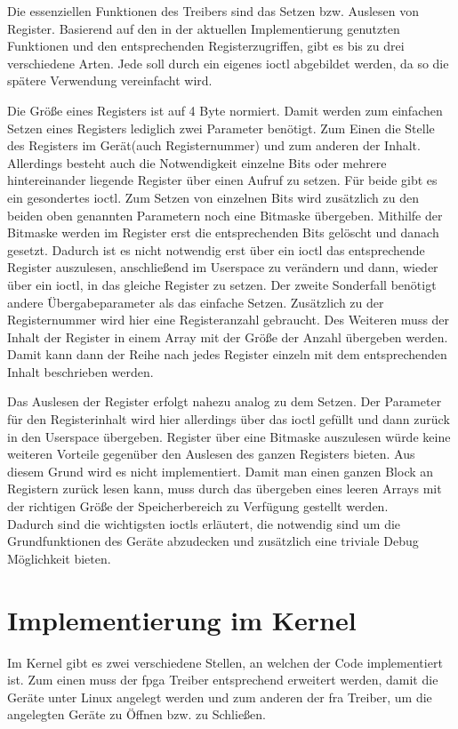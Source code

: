 Die essenziellen Funktionen des Treibers sind das Setzen bzw. Auslesen von Register. Basierend auf den in der aktuellen Implementierung genutzten Funktionen und den entsprechenden Registerzugriffen, gibt es bis zu drei verschiedene Arten. Jede soll durch ein eigenes \ac{ioctl} abgebildet werden, da so die spätere Verwendung vereinfacht wird.  


Die Größe eines Registers ist auf 4 Byte normiert. Damit werden zum einfachen Setzen eines Registers lediglich zwei Parameter benötigt. Zum Einen die Stelle des Registers im Gerät(auch Registernummer) und zum anderen der Inhalt. 
Allerdings besteht auch die Notwendigkeit einzelne Bits oder mehrere hintereinander liegende Register über einen Aufruf zu setzen. Für beide gibt es ein gesondertes \ac{ioctl}. Zum Setzen von einzelnen Bits wird zusätzlich zu den beiden oben genannten Parametern noch eine Bitmaske übergeben. Mithilfe der Bitmaske werden im Register erst die entsprechenden Bits gelöscht und danach gesetzt. Dadurch ist es nicht notwendig erst über ein \ac{ioctl} das entsprechende Register auszulesen, anschließend im Userspace zu verändern und dann, wieder über ein \ac{ioctl}, in das gleiche Register zu setzen.
Der zweite Sonderfall benötigt andere Übergabeparameter als das einfache Setzen. Zusätzlich zu der Registernummer wird hier eine Registeranzahl gebraucht. Des Weiteren muss der Inhalt der Register in einem Array mit der Größe der Anzahl übergeben werden. Damit kann dann der Reihe nach jedes Register einzeln mit dem entsprechenden Inhalt beschrieben werden.


Das Auslesen der Register erfolgt nahezu analog zu dem Setzen. Der Parameter für den Registerinhalt wird hier allerdings über das \ac{ioctl} gefüllt und dann zurück in den Userspace übergeben. 
Register über eine Bitmaske auszulesen würde keine weiteren Vorteile gegenüber den Auslesen des ganzen Registers bieten. Aus diesem Grund wird es nicht implementiert.  
Damit man einen ganzen Block an Registern zurück lesen kann, muss durch das übergeben eines leeren Arrays mit der richtigen Größe der Speicherbereich zu Verfügung gestellt werden.\\

Dadurch sind die wichtigsten \ac{ioctl}s erläutert, die notwendig sind um die Grundfunktionen des Geräte abzudecken und zusätzlich eine triviale Debug Möglichkeit bieten.

\section{Implementierung im Kernel}\label{sec:kernel}
Im Kernel gibt es zwei verschiedene Stellen, an welchen der Code implementiert ist. Zum einen muss der \ac{fpga} Treiber entsprechend erweitert werden, damit die Geräte unter Linux angelegt werden und zum anderen der \ac{fra} Treiber, um die angelegten Geräte zu Öffnen bzw. zu Schließen. \\


